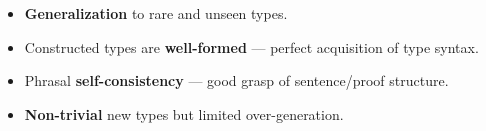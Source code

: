 \documentclass[a0paper,fleqn]{betterposter}
\begin{document}
{\vspace{20pt}
\begin{itemize}
    \item \textbf{Generalization} to rare and unseen types.
    \item Constructed types are {\bf well-formed} --- perfect acquisition of type syntax.
    \item Phrasal \textbf{self-consistency} --- good grasp of sentence/proof structure.
    \item \textbf{Non-trivial} new types but limited over-generation.
\end{itemize}

\vspace{40pt}

}
\end{document}
